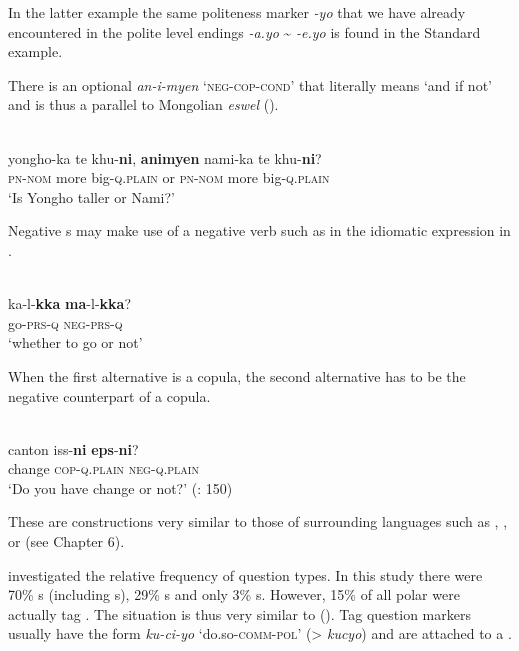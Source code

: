 \noindent In the latter example the same politeness marker \textit{-yo} that we have already encountered in the polite level endings \textit{-a.yo} {\textasciitilde} \textit{-e.yo} is found in the Standard  example.

There is an optional  \textit{an-i-myen} ‘\textsc{neg}-\textsc{cop}-\textsc{cond}’ that literally means ‘and if not’ \citep[20]{Sohn1994} and is thus a parallel to Mongolian \textit{eswel} ().

\ea%
    \label{ex:kore:8}
    \\
    \gll yongho-ka  te  khu-\textbf{{ni}}, \textbf{{animyen}} nami-ka  te khu-\textbf{{ni}}?\\
    \textsc{pn}-\textsc{nom}  more  big-\textsc{q.plain}  or    \textsc{pn}-\textsc{nom}  more big-\textsc{q.plain}\\
    \glt ‘Is Yongho taller or Nami?’ \citep[20]{Sohn1994}
    \z

Negative s may make use of a negative verb such as in the idiomatic expression in .

\ea%
    \label{ex:kore:9}
    \\
    \gll ka-l-\textbf{{kka}} \textbf{{ma}}-l-\textbf{{kka}}?\\
    go-\textsc{prs}-\textsc{q}  \textsc{neg}-\textsc{prs}-\textsc{q}\\
    \glt ‘whether to go or not’ \citep[392]{Sohn1999}
    \z

\noindent When the first alternative is a copula, the second alternative has to be the negative counterpart of a copula.

\ea%
    \label{ex:kore:10}
    \\
    \gll canton    iss-\textbf{{ni}} \textbf{{eps}}-\textbf{{ni}}?\\
    change    \textsc{cop}-\textsc{q.plain}  \textsc{neg}-\textsc{q.plain}\\
    \glt ‘Do you have change or not?’ (\citealt{Kim-Renaud2012}: 150)
    \z

\noindent These are constructions very similar to those of surrounding languages such as , , or  (see Chapter 6).

\citet[2783]{Yoon2010} investigated the relative frequency of question types. In this study there were 70\% s (including s), 29\% s and only 3\% s. However, 15\% of all polar  were actually tag . The situation is thus very similar to  (). Tag question markers usually have the form \textit{ku-ci-yo} ‘do.so-\textsc{comm}-\textsc{pol}’ (> \textit{kucyo}) and are attached to a .

